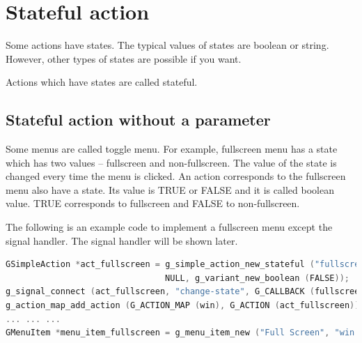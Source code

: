 \section{Stateful action}\label{stateful-action}

Some actions have states. The typical values of states are boolean or
string. However, other types of states are possible if you want.

Actions which have states are called stateful.

\subsection{Stateful action without a
parameter}\label{stateful-action-without-a-parameter}

Some menus are called toggle menu. For example, fullscreen menu has a
state which has two values -- fullscreen and non-fullscreen. The value
of the state is changed every time the menu is clicked. An action
corresponds to the fullscreen menu also have a state. Its value is TRUE
or FALSE and it is called boolean value. TRUE corresponds to fullscreen
and FALSE to non-fullscreen.

The following is an example code to implement a fullscreen menu except
the signal handler. The signal handler will be shown later.

\begin{lstlisting}[language=C]
GSimpleAction *act_fullscreen = g_simple_action_new_stateful ("fullscreen",
                                NULL, g_variant_new_boolean (FALSE));
g_signal_connect (act_fullscreen, "change-state", G_CALLBACK (fullscreen_changed), win);
g_action_map_add_action (G_ACTION_MAP (win), G_ACTION (act_fullscreen));
... ... ...
GMenuItem *menu_item_fullscreen = g_menu_item_new ("Full Screen", "win.fullscreen");
\end{lstlisting}

